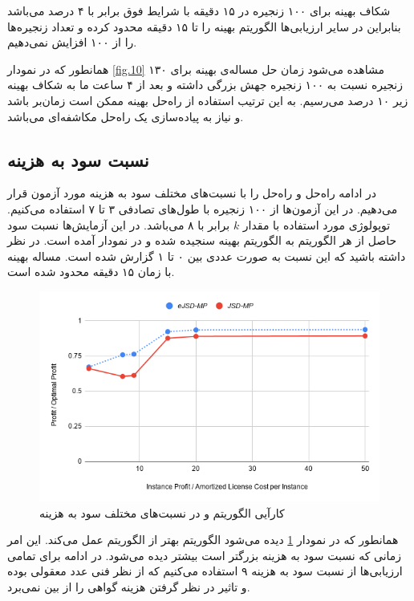شکاف بهینه برای ۱۰۰ زنجیره در ۱۵ دقیقه با شرایط فوق برابر با ۴ درصد می‌باشد بنابراین
در سایر ارزیابی‌ها الگوریتم بهینه را تا ۱۵ دقیقه محدود کرده و تعداد زنجیره‌ها را از ۱۰۰ افزایش نمی‌دهیم.

همانطور که در نمودار \ref{fig.10} مشاهده می‌شود زمان حل مساله‌ی بهینه برای ۱۳۰ زنجیره نسبت به ۱۰۰ زنجیره جهش بزرگی داشته
و بعد از ۴ ساعت ما به شکاف بهینه زیر ۱۰ درصد می‌رسیم.
به این ترتیب استفاده از راه‌حل بهینه ممکن است زمان‌بر باشد و نیاز به پیاده‌سازی یک راه‌حل مکاشفه‌ای می‌باشد.

\subsection{نسبت سود به هزینه}

در ادامه راه‌حل  و راه‌حل  را با نسبت‌های مختلف سود به هزینه مورد آزمون قرار می‌دهیم. 
در این آزمون‌ها از ۱۰۰ زنجیره با طول‌های تصادفی ۳ تا ۷ استفاده می‌کنیم.
توپولوژی مورد استفاده
با مقدار \(k\)
برابر با ۸
می‌باشد.
در این آزمایش‌ها نسبت سود حاصل از هر الگوریتم به الگوریتم بهینه سنجیده شده و در نمودار آمده است.
در نظر داشته باشید که این نسبت به صورت عددی بین ۰ تا ۱ گزارش شده است.
مساله بهینه با زمان ۱۵ دقیقه محدود شده است.


\begin{figure}[h]
\center\includegraphics[scale=.7]{images/chart-1}
\caption{کارآیی الگوریتم  و  در نسبت‌های مختلف سود به هزینه}
\label{fig.4}
\end{figure}

همانطور که در نمودار \ref{fig.4} دیده می‌شود الگوریتم  بهتر از الگوریتم  عمل می‌کند.
این امر زمانی که نسبت سود به هزینه بزرگتر است بیشتر دیده می‌شود.
در ادامه برای تمامی ارزیابی‌ها از نسبت سود به هزینه ۹ استفاده می‌کنیم که از نظر فنی عدد معقولی بوده و تاثیر در نظر گرفتن هزینه گواهی را از بین نمی‌برد.

